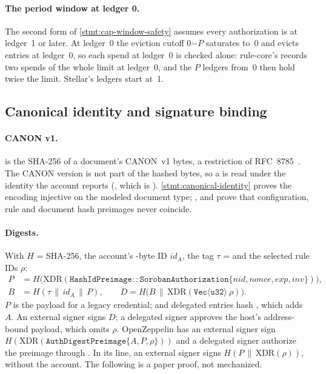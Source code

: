 \paragraph{The period window at ledger 0.} The second form of
\ref{stmt:cap-window-safety} assumes every authorization is at ledger~1 or later.
At ledger~0 the eviction cutoff $0 \mathbin{\dot-} P$ saturates to~0 and evicts
entries at ledger~0, so each spend at ledger~0 is checked alone: rule-core's
 records two spends of the whole limit at ledger~0,
and the $P$ ledgers from~0 then hold twice the limit. Stellar's ledgers start
at~1.

\subsection{Canonical identity and signature binding}

\paragraph{CANON v1.}  is the SHA-256 of a document's CANON~v1
bytes, a restriction of RFC~8785~\cite{rfc8785}. The CANON version is not part of
the hashed bytes, so a  is read under the identity the account
reports (, which is ).
\ref{stmt:canonical-identity} proves the encoding injective on the modeled
document type; ,
 and  prove
that configuration, rule and document hash preimages never coincide.

\paragraph{Digests.} With $H$ = SHA-256, the account's
-byte ID $\mathit{id}_A$, the tag $\tau$ =
 and the selected rule IDs $\rho$:
\begin{align*}
  P &= H\bigl(\mathrm{XDR}(\mathtt{HashIdPreimage::SorobanAuthorization}\{\mathit{nid}, \mathit{nonce}, \mathit{exp}, \mathit{inv}\})\bigr),\\
  B &= H(\tau \,\|\, \mathit{id}_A \,\|\, P), \qquad
  D = H\bigl(B \,\|\, \mathrm{XDR}(\mathtt{Vec}\langle\mathtt{u32}\rangle\ \rho)\bigr).
\end{align*}
$P$ is the payload for a legacy  credential;  and
delegated entries hash , which adds $A$. An
external signer signs $D$; a delegated signer approves the host's address-bound
payload, which omits $\rho$. OpenZeppelin  has an external
signer sign $H(\mathrm{XDR}(\mathtt{AuthDigestPreimage}\{A,P,\rho\}))$ and a
delegated signer authorize the preimage through .
In its  line, an external signer signs
$H(P\,\|\,\mathrm{XDR}(\rho))$, without the account. The following is a paper
proof, not mechanized.

